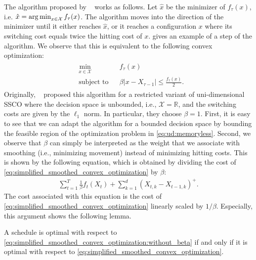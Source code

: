 The algorithm proposed by \citeauthor{Bansal2015}~\cite{Bansal2015} works as follows. Let $\hat{x}$ be the minimizer of $f_{\tau}(x)$, i.e. $\hat{x} = \operatorname*{arg\,min}_{x \in \mathcal{X}} f_{\tau}(x)$. The algorithm moves into the direction of the minimizer until it either reaches $\hat{x}$, or it reaches a configuration $x$ where its switching cost equals twice the hitting cost of $x$.  gives an example of a step of the algorithm. We observe that this is equivalent to the following convex optimization: \begin{align}\label{eq:ud:memoryless}\begin{aligned}
    &\min_{x \in \mathcal{X}} &&f_{\tau}(x) \\
    &\text{subject to}        &&\beta |x - X_{\tau-1}| \leq \frac{f_{\tau}(x)}{2}.
\end{aligned}\end{align} Originally, \citeauthor{Bansal2015}~\cite{Bansal2015} proposed this algorithm for a restricted variant of uni-dimensional SSCO where the decision space is unbounded, i.e., $\mathcal{X} = \mathbb{R}$, and the switching costs are given by the $\ell_1$ norm. In particular, they choose $\beta = 1$. First, it is easy to see that we can adapt the algorithm for a bounded decision space by bounding the feasible region of the optimization problem in \cref{eq:ud:memoryless}. Second, we observe that $\beta$ can simply be interpreted as the weight that we associate with smoothing (i.e., minimizing movement) instead of minimizing hitting costs. This is shown by the following equation, which is obtained by dividing the cost of \cref{eq:simplified_smoothed_convex_optimization} by $\beta$: \begin{align}\label{eq:simplified_smoothed_convex_optimization:without_beta}
    \sum_{t=1}^T \frac{1}{\beta} f_t(X_t) + \sum_{k=1}^d (X_{t,k} - X_{t-1,k})^+.
\end{align} The cost associated with this equation is the cost of \cref{eq:simplified_smoothed_convex_optimization} linearly scaled by $1 / \beta$. Especially, this argument shows the following lemma.

\begin{lemma}\label{lemma:switching_cost_absolute_vs_positive_movement}
A schedule is optimal with respect to \cref{eq:simplified_smoothed_convex_optimization:without_beta} if and only if it is optimal with respect to \cref{eq:simplified_smoothed_convex_optimization}.
\end{lemma}

